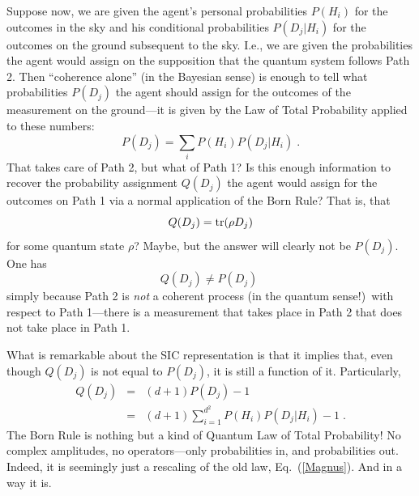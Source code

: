 Suppose now, we are given the agent's personal probabilities $P(H_i)$ for the outcomes in the sky and his conditional probabilities $P(D_j|H_i)$ for the outcomes on the ground subsequent to the sky.  I.e., we are given the probabilities the agent would assign on the supposition that the quantum system follows Path 2.  Then ``coherence alone'' (in the Bayesian sense) is enough to tell what probabilities $P(D_j)$ the agent should assign for the outcomes of the measurement on the ground---it is given by the Law of Total Probability applied to these numbers:
\begin{equation}
P(D_j)=\sum_i P(H_i) P(D_j|H_i)\;.
\label{Magnus}
\end{equation}
That takes care of Path 2, but what of Path 1?  Is this enough information to recover the probability assignment $Q(D_j)$ the agent would assign for the outcomes on Path 1 via a normal application of the Born Rule?  That is, that
\begin{equation}
Q(D_j)={\rm tr} (\rho D_j)
\label{EmmaPlayStarWars}
\end{equation}
for some quantum state $\rho$?  Maybe, but the answer will clearly not be $P(D_j)$.  One has
\begin{equation}
Q(D_j)\ne P(D_j)\;
\end{equation}
simply because Path 2 is {\it not\/} a coherent process (in the quantum sense!)\ with respect to Path 1---there is a measurement that takes place in Path 2 that does not take place in Path 1.

What is remarkable about the SIC representation is that it implies that, even though $Q(D_j)$ is not equal to $P(D_j)$, it is still a function of it.  Particularly,
\begin{eqnarray}
Q(D_j) &=& (d+1) P(D_j) - 1\nonumber
\\
&=&
(d+1)\sum_{i=1}^{d^2} P(H_i) P(D_j|H_i) - 1\;.
\label{ScoobyDoo}
\end{eqnarray}
The Born Rule is nothing but a kind of Quantum Law of Total Probability!  No complex amplitudes, no operators---only probabilities in, and probabilities out.  Indeed, it is seemingly just a rescaling of the old law, Eq.~(\ref{Magnus}).  And in a way it is.

